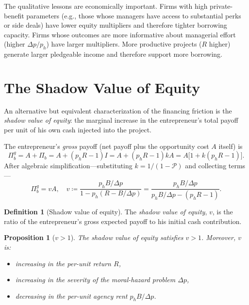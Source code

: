 \documentclass[11pt,a4paper,oneside]{book}
\theoremstyle{plain}
\newtheorem{proposition}[theorem]{Proposition}
\theoremstyle{definition}
\newtheorem{definition}[theorem]{Definition}
\theoremstyle{remark}
\numberwithin{equation}{chapter}
\begin{document}
The qualitative lessons are economically important.
Firms with high private-benefit parameters (e.g., those whose managers have access to substantial perks or side deals) have lower equity multipliers and therefore tighter borrowing capacity.
Firms whose outcomes are more informative about managerial effort (higher $\Delta p / p_h$) have larger multipliers.
More productive projects ($R$ higher) generate larger pledgeable income and therefore support more borrowing.

\section{The Shadow Value of Equity}
\label{sec:EM-shadow-value}

An alternative but equivalent characterization of the financing friction is the \emph{shadow value of equity}: the marginal increase in the entrepreneur's total payoff per unit of his own cash injected into the project.

The entrepreneur's \emph{gross} payoff (net payoff plus the opportunity cost $A$ itself) is
\begin{equation}\label{eq:EM-gross-payoff}
  \Pi_b^g = A + \Pi_b = A + (p_h R - 1) I = A + (p_h R - 1) k A = A \bigl[ 1 + k(p_h R - 1) \bigr].
\end{equation}
After algebraic simplification---substituting $k = 1/(1 - \mathcal{P})$ and collecting terms---
\begin{equation}\label{eq:EM-v}
  \Pi_b^g = v A, \quad v \coloneqq \frac{p_h B/\Delta p}{1 - p_h(R - B/\Delta p)} = \frac{p_h B/\Delta p}{p_h B/\Delta p - (p_h R - 1)}.
\end{equation}

\begin{definition}[Shadow value of equity]\label{def:v}
The \emph{shadow value of equity}, $v$, is the ratio of the entrepreneur's gross expected payoff to his initial cash contribution.
\end{definition}

\begin{proposition}[$v > 1$]\label{prop:EM-v-bigger-1}
The shadow value of equity satisfies $v > 1$.
Moreover, $v$ is:
\begin{itemize}
  \item \emph{increasing} in the per-unit return $R$,
  \item \emph{increasing} in the severity of the moral-hazard problem $\Delta p$,
  \item \emph{decreasing} in the per-unit agency rent $p_h B / \Delta p$.
\end{itemize}
\end{proposition}
\end{document}
